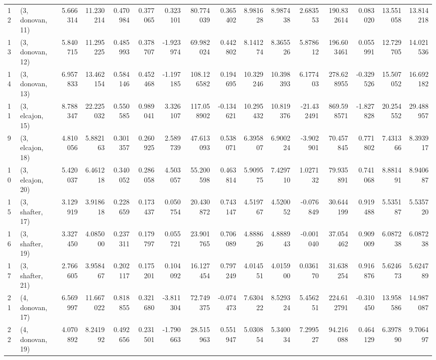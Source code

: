 \begin{tabular}{llrrrrrrrrrrrrrr}
12 &  (3, donovan, 11) &   5.666314 &  11.230214 &   0.470984 &  0.377065 &   0.323101 &   80.774039 &  0.365402 &   8.981628 &   8.987438 &   2.683553 &   190.832614 &  0.083020 &  13.551058 &  13.814218 \\
13 &  (3, donovan, 12) &   5.840715 &  11.295225 &   0.485993 &  0.378707 &  -1.923974 &   69.982024 &  0.442802 &   8.141274 &   8.365526 &   5.878612 &   196.603461 &  0.055991 &  12.729705 &  14.021536 \\
14 &  (3, donovan, 13) &   6.957833 &  13.462154 &   0.584146 &  0.452468 &  -1.197185 &  108.126582 &  0.194695 &  10.329246 &  10.398393 &   6.177403 &   278.628955 & -0.329526 &  15.507052 &  16.692182 \\
11 &  (3, elcajon, 15) &   8.788347 &  22.225032 &   0.550585 &  0.989041 &   3.326107 &  117.058902 & -0.134621 &  10.295432 &  10.819376 & -21.432491 &   869.598571 & -1.827828 &  20.254552 &  29.488957 \\
9  &  (3, elcajon, 18) &   4.810056 &   5.882163 &   0.301357 &  0.260925 &   2.589739 &   47.613093 &  0.538071 &   6.395807 &   6.900224 &  -3.902901 &    70.457845 &  0.771802 &   7.431366 &   8.393917 \\
10 &  (3, elcajon, 20) &   5.420037 &   6.461218 &   0.340052 &  0.286058 &   4.503057 &   55.200598 &  0.463814 &   5.909575 &   7.429710 &   1.027132 &    79.935891 &  0.741068 &   8.881491 &   8.940687 \\
15 &  (3, shafter, 17) &   3.129919 &   3.918618 &   0.228659 &  0.173437 &   0.050754 &   20.430872 &  0.743147 &   4.519767 &   4.520052 &  -0.076849 &    30.644199 &  0.919488 &   5.535187 &   5.535720 \\
16 &  (3, shafter, 19) &   3.327450 &   4.085000 &   0.237311 &  0.179797 &   0.055721 &   23.901765 &  0.706089 &   4.888626 &   4.888943 &  -0.001040 &    37.054462 &  0.909009 &   6.087238 &   6.087238 \\
17 &  (3, shafter, 21) &   2.766605 &   3.958467 &   0.202117 &  0.175201 &   0.104092 &   16.127454 &  0.797249 &   4.014551 &   4.015900 &   0.036170 &    31.638254 &  0.916876 &   5.624673 &   5.624789 \\
21 &  (4, donovan, 17) &   6.569997 &  11.667022 &   0.818855 &  0.321680 &  -3.811304 &   72.749375 & -0.074473 &   7.630422 &   8.529324 &   5.456251 &   224.612791 & -0.310450 &  13.958586 &  14.987087 \\
22 &  (4, donovan, 19) &   4.070892 &   8.241992 &   0.492656 &  0.231501 &  -1.790663 &   28.515963 &  0.551947 &   5.030854 &   5.340034 &   7.299527 &    94.216088 &  0.464129 &   6.397890 &   9.706497 \\

\end{tabular}
